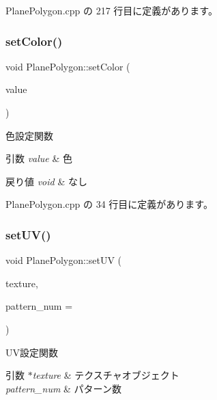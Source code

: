  Plane\+Polygon.\+cpp の 217 行目に定義があります。

\mbox{\label{class_plane_polygon_adc578914c14b2648455e12d2d3724a07}} 
\subsubsection{\texorpdfstring{set\+Color()}{setColor()}}
{\footnotesize\ttfamily void Plane\+Polygon\+::set\+Color (\begin{DoxyParamCaption}\item[{\mbox{\hyperlink{_vector3_d_8h_a680c30c4a07d86fe763c7e01169cd6cc}{X\+Color4}}}]{value }\end{DoxyParamCaption})}



色設定関数 


\begin{DoxyParams}{引数}
{\em value} & 色 \\
\hline
\end{DoxyParams}

\begin{DoxyRetVals}{戻り値}
{\em void} & なし \\
\hline
\end{DoxyRetVals}


 Plane\+Polygon.\+cpp の 34 行目に定義があります。

\mbox{\label{class_plane_polygon_af2591516a432a77b95932bbb076fad80}} 
\subsubsection{\texorpdfstring{set\+U\+V()}{setUV()}}
{\footnotesize\ttfamily void Plane\+Polygon\+::set\+UV (\begin{DoxyParamCaption}\item[{\mbox{\hyperlink{class_texture_object}{Texture\+Object}} $\ast$}]{texture,  }\item[{int}]{pattern\+\_\+num = {} }\end{DoxyParamCaption})}



U\+V設定関数 


\begin{DoxyParams}{引数}
{\em $\ast$texture} & テクスチャオブジェクト \\
\hline
{\em pattern\+\_\+num} & パターン数 \\
\hline
\end{DoxyParams}

